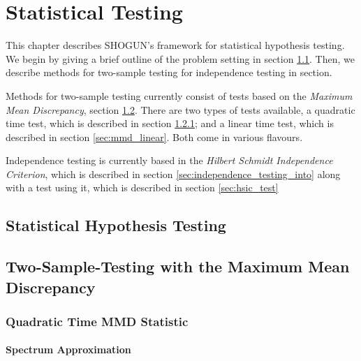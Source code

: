 %

\chapter{Statistical Testing}
This chapter describes SHOGUN's framework for statistical hypothesis testing. We begin by giving a brief outline of the problem setting in section \ref{sec:hypothesis_testing_into}. Then, we describe methods for two-sample testing for independence testing in section.

Methods for two-sample testing currently consist of tests based on the \emph{Maximum Mean Discrepancy}, section \ref{sec:mmd_into}. There are two types of tests available, a quadratic time test, which is described in section \ref{sec:mmd_quadratic}; and a linear time test, which is described in section \ref{sec:mmd_linear}. Both come in various flavours.

Independence testing is currently based in the \emph{Hilbert Schmidt Independence Criterion}, which is described in section \ref{sec:independence_testing_into} along with a test using it, which is described in section \ref{sec:hsic_test}

\section{Statistical Hypothesis Testing}
\label{sec:hypothesis_testing_into}

\section{Two-Sample-Testing with the Maximum Mean Discrepancy}
\label{sec:mmd_into}

\subsection{Quadratic Time MMD Statistic}
\label{sec:mmd_quadratic}

\subsubsection{Spectrum Approximation}
